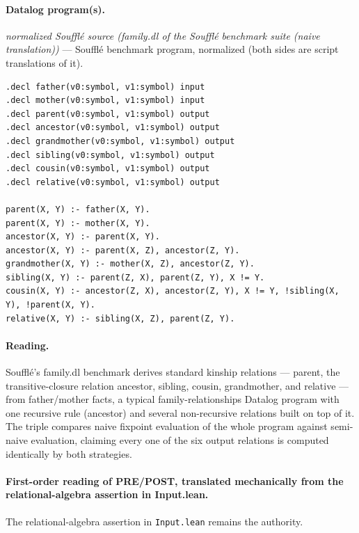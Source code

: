 \documentclass[10pt]{article}
\begin{document}
\paragraph{Datalog program(s).}

{\raggedright\textit{normalized Soufflé source (family.dl of the Soufflé benchmark suite (naive translation))} --- Soufflé benchmark program, normalized (both sides are script translations of it).\par}

\begin{Verbatim}[fontsize=\scriptsize,breaklines=true,breakanywhere=true,frame=single,framesep=1.5mm]
.decl father(v0:symbol, v1:symbol) input
.decl mother(v0:symbol, v1:symbol) input
.decl parent(v0:symbol, v1:symbol) output
.decl ancestor(v0:symbol, v1:symbol) output
.decl grandmother(v0:symbol, v1:symbol) output
.decl sibling(v0:symbol, v1:symbol) output
.decl cousin(v0:symbol, v1:symbol) output
.decl relative(v0:symbol, v1:symbol) output

parent(X, Y) :- father(X, Y).
parent(X, Y) :- mother(X, Y).
ancestor(X, Y) :- parent(X, Y).
ancestor(X, Y) :- parent(X, Z), ancestor(Z, Y).
grandmother(X, Y) :- mother(X, Z), ancestor(Z, Y).
sibling(X, Y) :- parent(Z, X), parent(Z, Y), X != Y.
cousin(X, Y) :- ancestor(Z, X), ancestor(Z, Y), X != Y, !sibling(X, Y), !parent(X, Y).
relative(X, Y) :- sibling(X, Z), parent(Z, Y).
\end{Verbatim}

\paragraph{Reading.} Soufflé's family.dl benchmark derives standard kinship relations --- parent, the transitive-closure relation ancestor, sibling, cousin, grandmother, and relative --- from father/mother facts, a typical family-relationships Datalog program with one recursive rule (ancestor) and several non-recursive relations built on top of it. The triple compares naive fixpoint evaluation of the whole program against semi-naive evaluation, claiming every one of the six output relations is computed identically by both strategies.

\paragraph{First-order reading of PRE/POST, translated mechanically from the relational-algebra assertion in Input.lean.} The relational-algebra assertion in \texttt{Input.lean} remains the authority.
\end{document}
